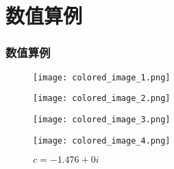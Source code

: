 \documentclass[11pt]{beamer}																										\usetheme{Madrid}
\begin{document}
\section{数值算例}
\begin{frame}[fragile]
	 \frametitle{数值算例}

\begin{figure}[h]
	\centering
	\begin{minipage}{0.48\textwidth}
		\centering
		\texttt{[image: colored\_image\_1.png]}
		\caption{$c = -0.79 + 0.15i$ }
	\end{minipage}
	\begin{minipage}{0.48\textwidth}
		\centering
		\texttt{[image: colored\_image\_2.png]}
		\caption{$c = 0.28 + 0.085i$}
	\end{minipage}
	\begin{minipage}{0.48\textwidth}
		\centering
		\texttt{[image: colored\_image\_3.png]}
		\caption{$c = -0.12 - 0.77i$}
	\end{minipage}
	\begin{minipage}{0.48\textwidth}
		\centering
		\texttt{[image: colored\_image\_4.png]}
		\caption{$c = -1.476 + 0i$ }
	\end{minipage}
\end{figure}
\end{frame}



\end{document}
